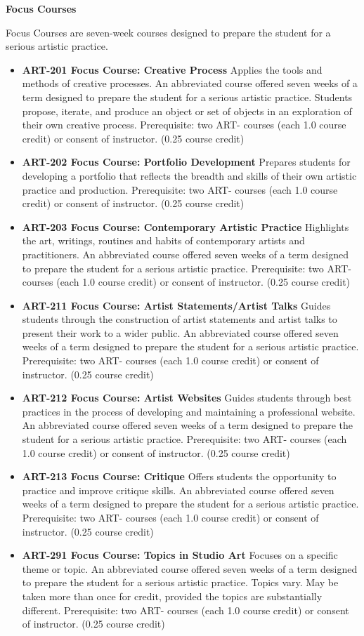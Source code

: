 \documentclass[
  letterpaper,
]{scrbook}
\providecommand{\tightlist}{%
  \setlength{\itemsep}{0pt}\setlength{\parskip}{0pt}}
\begin{document}
\textbf{Focus Courses}

Focus Courses are seven-week courses designed to prepare the student for
a serious artistic practice.

\begin{itemize}
\tightlist
\item
  \textbf{ART-201 Focus Course: Creative Process} Applies the tools and
  methods of creative processes. An abbreviated course offered seven
  weeks of a term designed to prepare the student for a serious artistic
  practice. Students propose, iterate, and produce an object or set of
  objects in an exploration of their own creative process. Prerequisite:
  two ART- courses (each 1.0 course credit) or consent of instructor.
  (0.25 course credit)
\item
  \textbf{ART-202 Focus Course: Portfolio Development} Prepares students
  for developing a portfolio that reflects the breadth and skills of
  their own artistic practice and production. Prerequisite: two ART-
  courses (each 1.0 course credit) or consent of instructor. (0.25
  course credit)
\item
  \textbf{ART-203 Focus Course: Contemporary Artistic Practice}
  Highlights the art, writings, routines and habits of contemporary
  artists and practitioners. An abbreviated course offered seven weeks
  of a term designed to prepare the student for a serious artistic
  practice. Prerequisite: two ART- courses (each 1.0 course credit) or
  consent of instructor. (0.25 course credit)
\item
  \textbf{ART-211 Focus Course: Artist Statements/Artist Talks} Guides
  students through the construction of artist statements and artist
  talks to present their work to a wider public. An abbreviated course
  offered seven weeks of a term designed to prepare the student for a
  serious artistic practice. Prerequisite: two ART- courses (each 1.0
  course credit) or consent of instructor. (0.25 course credit)
\item
  \textbf{ART-212 Focus Course: Artist Websites} Guides students through
  best practices in the process of developing and maintaining a
  professional website. An abbreviated course offered seven weeks of a
  term designed to prepare the student for a serious artistic practice.
  Prerequisite: two ART- courses (each 1.0 course credit) or consent of
  instructor. (0.25 course credit)
\item
  \textbf{ART-213 Focus Course: Critique} Offers students the
  opportunity to practice and improve critique skills. An abbreviated
  course offered seven weeks of a term designed to prepare the student
  for a serious artistic practice. Prerequisite: two ART- courses (each
  1.0 course credit) or consent of instructor. (0.25 course credit)
\item
  \textbf{ART-291 Focus Course: Topics in Studio Art} Focuses on a
  specific theme or topic. An abbreviated course offered seven weeks of
  a term designed to prepare the student for a serious artistic
  practice. Topics vary. May be taken more than once for credit,
  provided the topics are substantially different. Prerequisite: two
  ART- courses (each 1.0 course credit) or consent of instructor. (0.25
  course credit)
\end{itemize}
\end{document}
